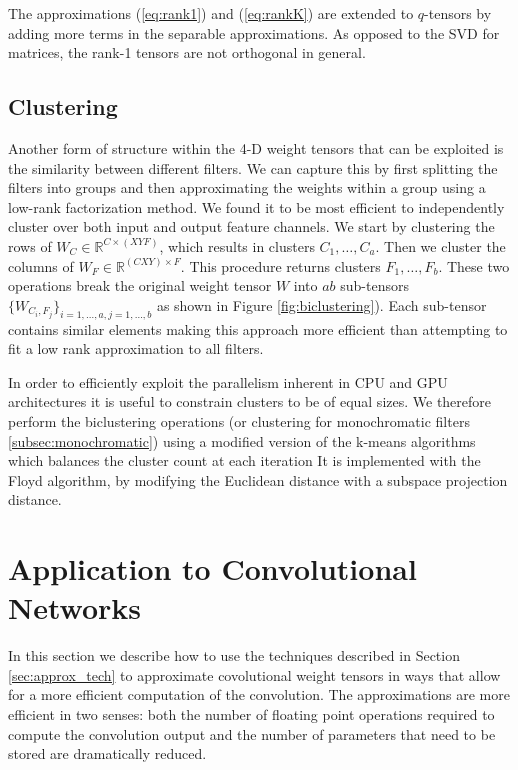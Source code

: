 The approximations (\ref{eq:rank1}) and (\ref{eq:rankK}) are extended to $q$-tensors 
by adding more terms in the separable approximations.
As opposed to the SVD for matrices, the rank-1 tensors are not orthogonal in general. 


\subsection{Clustering}\label{subsec:clustering}
Another form of structure within the 4-D weight tensors that can be exploited is the similarity between different filters. 
We can capture this by first splitting the filters into groups and then approximating the weights within a group using a low-rank factorization method.  
We found it to be most efficient to independently cluster
over both input and output feature channels. We start by clustering the
rows of $W_C \in \mathbb{R}^{C \times (XYF)}$, which results in
clusters $C_1, \dots, C_a$. Then we cluster the columns of $W_F  \in
\mathbb{R}^{(CXY) \times F}$. This procedure returns clusters $F_1,
\dots, F_b$. These two operations break the original weight tensor $W$
into $ab$ sub-tensors $\{W_{C_i, F_j}\}_{i = 1, \dots, a, j = 1,
  \dots, b}$ as shown in Figure \ref{fig:biclustering}). Each
sub-tensor contains similar elements making this approach more
efficient than attempting to fit a low rank approximation to all
filters.

In order to efficiently exploit the parallelism inherent in CPU and GPU
architectures it is useful to constrain clusters to be of equal sizes. 
We therefore perform the biclustering operations (or clustering 
for monochromatic filters \ref{subsec:monochromatic}) using a modified
version of the k-means algorithms which balances the cluster count at
each iteration
It is implemented with the Floyd algorithm, by modifying the Euclidean distance
with a subspace projection distance.

\section{Application to Convolutional Networks}\label{sec:application}
In this section we describe how to use the techniques described in
Section \ref{sec:approx_tech} to approximate covolutional weight
tensors in ways that allow for a more efficient computation of the
convolution. The approximations are more efficient in two senses:
both the number of floating point operations required to compute the
convolution output and the number of parameters that need to be stored
are dramatically reduced.

